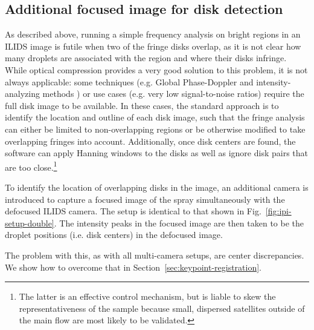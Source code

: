 \documentclass[11.5pt,oneside]{book}
\newcommand*{\figref}[1]{Fig.~\ref{#1}}
\newcommand*{\secref}[1]{Section~\ref{#1}}
\begin{document}
\subsection{Additional focused image for disk detection}
As described above, running a simple frequency analysis on bright regions in an
ILIDS image is futile when two of the fringe disks overlap, as it is not clear
how many droplets are associated with the region and where their disks infringe.
While optical compression provides a very good solution to this problem, it is
not always applicable: some techniques (e.g. Global
Phase-Doppler \cite{Damaschke01} and intensity-analyzing methods \cite{Querel10})
or use cases (e.g. very low signal-to-noise ratios) require the full disk image
to be available. In these cases, the standard approach is to identify the
location and outline of each disk image, such that the fringe analysis can
either be limited to non-overlapping regions or be otherwise modified to take
overlapping fringes into account. Additionally, once disk centers are found, the
software can apply Hanning windows to the disks as well as ignore disk pairs
that are too close.\footnote{The latter is an effective control mechanism, but
    is liable to skew the representativeness of the sample because small,
dispersed satellites outside of the main flow are most likely to be validated.}

To identify the location of overlapping disks in the image, an additional camera
is introduced to capture a focused image of the spray simultaneously with the
defocused ILIDS camera. The setup is identical to that shown in
\figref{fig:ipi-setup-double}. The intensity peaks in the focused image are then taken
to be the droplet positions (i.e. disk centers) in the defocused image.

The problem with this, as with all multi-camera setups, are center
discrepancies. We show how to overcome that in
\secref{sec:keypoint-registration}.
\end{document}
